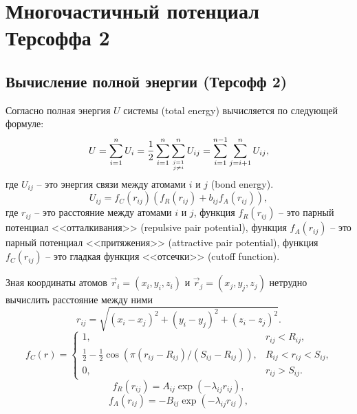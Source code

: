 \section{Многочастичный потенциал Терсоффа 2}

\subsection{Вычисление полной энергии (Терсофф 2)}

Согласно \cite{tersoff89} полная энергия $U$ системы (total energy) вычисляется по следующей формуле:
\begin{equation}\label{eq:tersoff89}
U = \displaystyle\sum_{i=1}^{n} U_i = \frac{1}{2}\sum_{i = 1}^{n}\sum_{j = 1 \atop j \neq i}^{n} U_{ij} = \sum_{i = 1}^{n - 1}\sum_{j = i + 1}^{n} U_{ij},
\end{equation}
где $U_{ij}$ -- это энергия связи между атомами $i$ и $j$ (bond energy).
\begin{equation}\label{eq:tersoff89_bondenergy}
U_{ij} = f_C(r_{ij})(f_R(r_{ij}) + b_{ij}f_A(r_{ij})),
\end{equation}
где $r_{ij}$ -- это расстояние между атомами $i$ и $j$, функция $f_R(r_{ij})$ -- это парный потенциал <<отталкивания>> (repulsive pair potential), функция $f_A(r_{ij})$ -- это парный потенциал <<притяжения>> (attractive pair potential), функция $f_C(r_{ij})$ -- это гладкая функция <<отсечки>> (cutoff function).

Зная координаты атомов $\vec{r}_i = (x_i, y_i, z_i)$ и $\vec{r}_j = (x_j, y_j, z_j)$ нетрудно вычислить расстояние между ними
\begin{equation}\label{eq:tersoff89_rij}
r_{ij} = \sqrt{(x_i - x_j)^2 + (y_i - y_j)^2 + (z_i - z_j)^2}.
\end{equation}
\[
f_C(r) =
\begin{cases}
	1, &\text{$r_{ij} < R_{ij}$,}\\
	\frac{1}{2} - \frac{1}{2}\cos(\pi (r_{ij} - R_{ij}) / (S_{ij} - R_{ij})), &\text{$R_{ij}< r_{ij} < S_{ij}$,}\\
	0, &\text{$r_{ij} > S_{ij}$.}
\end{cases}
\]
\begin{equation}
f_R(r_{ij}) = A_{ij} \exp (- \lambda_{ij} r_{ij}), 
\end{equation}
\begin{equation}
f_A(r_{ij}) = -B_{ij} \exp (- \lambda_{ij} r_{ij}),
\end{equation}

